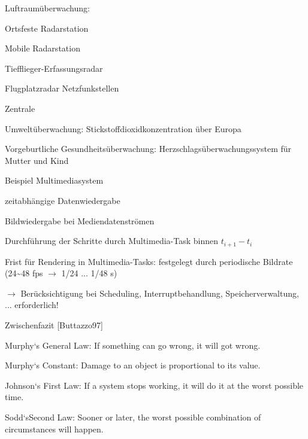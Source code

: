 \documentclass[a4paper]{article}
\begin{document}
\begin{multicols}{3}
    \begin{itemize*}
        \item
        Luftraumüberwachung:
        \begin{itemize*}
            \item Ortsfeste Radarstation
            \item Mobile Radarstation
            \item Tiefflieger-Erfassungsradar
            \item Flugplatzradar Netzfunkstellen
            \item Zentrale
        \end{itemize*}
        \item
        Umweltüberwachung: Stickstoffdioxidkonzentration über Europa
        \item
        Vorgeburtliche Gesundheitsüberwachung: Herzschlagsüberwachungssystem
        für Mutter und Kind
    \end{itemize*}

    Beispiel Multimediasystem

    \begin{itemize*}
        \item
        zeitabhängige Datenwiedergabe
        \item
        Bildwiedergabe bei Mediendatenströmen
        \item
        Durchführung der Schritte durch Multimedia-Task binnen $t_{i+1} -
            t_i$
        \item
        Frist für Rendering in Multimedia-Tasks: festgelegt durch periodische
        Bildrate (24\textasciitilde48 fps $\rightarrow$ 1/24
        ... 1/48 s)
        \item
        $\rightarrow$ Berücksichtigung bei Scheduling,
        Interruptbehandlung, Speicherverwaltung, ... erforderlich!
    \end{itemize*}

    Zwischenfazit [Buttazzo97]

    \begin{itemize*}
        \item
        Murphy`s General Law: If something can go wrong, it will got wrong.
        \item
        Murphy`s Constant: Damage to an object is proportional to its value.
        \item
        Johnson`s First Law: If a system stops working, it will do it at the
        worst possible time.
        \item
        Sodd`sSecond Law: Sooner or later, the worst possible combination of
        circumstances will happen.
    \end{itemize*}


\end{multicols}
\end{document}
